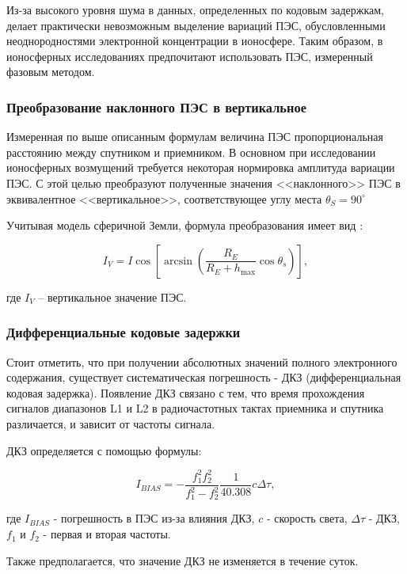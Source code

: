 \documentclass[a4paper]{article}
\begin{document}
Из-за высокого уровня шума в данных, определенных по кодовым задержкам, делает практически невозможным выделение вариаций ПЭС, обусловленными неоднородностями электронной концентрации в ионосфере. Таким образом, в ионосферных исследованиях предпочитают использовать ПЭС, измеренный фазовым методом. 

\subsubsection{Преобразование наклонного ПЭС  в вертикальное}
Измеренная по выше описанным формулам величина ПЭС пропорциональная расстоянию между спутником и приемником. В основном при исследовании ионосферных возмущений требуется некоторая нормировка амплитуда вариации ПЭС. С этой целью преобразуют полученные значения <<наклонного>> ПЭС в эквивалентное <<вертикальное>>, соответствующее углу места $\theta_S = 90^{\circ}$ 

Учитывая модель сферичной Земли, формула преобразования имеет вид \cite{klobuchar}:

\begin{equation}
I_V = I \cos{\left[ \arcsin{\left( \frac{R_E}{R_E + h_\text{max}} \cos{\theta_s}\right)} \right]},
\label{sfuntion}
\end{equation} 

где $I_V$ -- вертикальное значение ПЭС. 

\subsubsection{Дифференциальные кодовые задержки}
Стоит отметить, что при получении абсолютных значений полного электронного содержания, существует систематическая погрешность - ДКЗ (дифференциальная кодовая задержка). Появление ДКЗ связано с тем, что время прохождения сигналов диапазонов L1 и L2 в радиочастотных тактах приемника и спутника различается, и зависит от частоты сигнала.

ДКЗ определяется с помощью формулы:

\begin{equation}
I_{BIAS} = -\frac{f_1^2 f_2^2}{f_1^2 - f_2^2} \frac{1}{40.308} c\Delta \tau,
\end{equation}

где $I_{BIAS}$ - погрешность в ПЭС из-за влияния ДКЗ, $c$ - скорость света, $\Delta\tau$ - ДКЗ, $f_1$ и $f_2$ - первая и вторая частоты.

Также предполагается, что значение ДКЗ не изменяется в течение суток.
\end{document}
